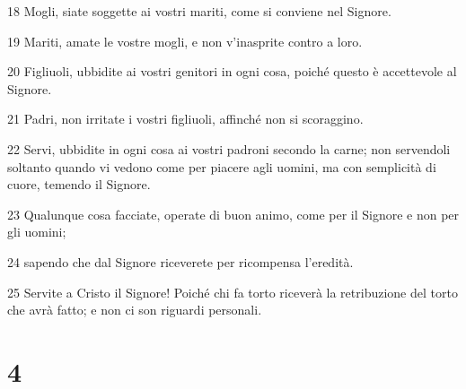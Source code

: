\par 18 Mogli, siate soggette ai vostri mariti, come si conviene nel Signore.
\par 19 Mariti, amate le vostre mogli, e non v'inasprite contro a loro.
\par 20 Figliuoli, ubbidite ai vostri genitori in ogni cosa, poiché questo è accettevole al Signore.
\par 21 Padri, non irritate i vostri figliuoli, affinché non si scoraggino.
\par 22 Servi, ubbidite in ogni cosa ai vostri padroni secondo la carne; non servendoli soltanto quando vi vedono come per piacere agli uomini, ma con semplicità di cuore, temendo il Signore.
\par 23 Qualunque cosa facciate, operate di buon animo, come per il Signore e non per gli uomini;
\par 24 sapendo che dal Signore riceverete per ricompensa l'eredità.
\par 25 Servite a Cristo il Signore! Poiché chi fa torto riceverà la retribuzione del torto che avrà fatto; e non ci son riguardi personali.

\chapter{4}

